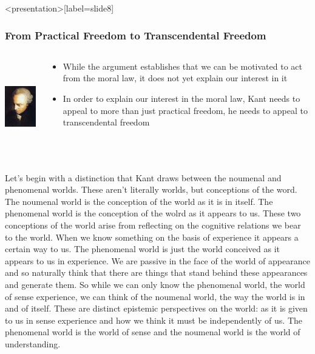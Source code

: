 \begin{frame}<presentation>[label=slide8]
    \frametitle{From Practical Freedom to Transcendental Freedom}
        \begin{columns}
            \begin{column}{3cm}
                \includegraphics[height=4cm]{../../graphics/kant.jpg}
            \end{column}
            \begin{column}{7cm}
                \begin{itemize}
                    \item While the argument establishes that we can be motivated to act from the moral law, it does not yet explain our interest in it
                    \item In order to explain our interest in the moral law, Kant needs to appeal to more than just \alert{practical freedom}, he needs to appeal to \alert{transcendental freedom}
                \end{itemize}
            \end{column}
        \end{columns}
\end{frame}

Let’s begin with a distinction that Kant draws between the noumenal and phenomenal worlds. These aren’t literally worlds, but conceptions of the word. The noumenal world is the conception of the world as it is in itself. The phenomenal world is the conception of the wolrd as it appears to us. These two conceptions of the world arise from reflecting on the cognitive relations we bear to the world. When we know something on the basis of experience it appears a certain way to us. The phenomenal world is just the world conceived as it appears to us in experience. We are passive in the face of the world of appearance and so naturally think that there are things that stand behind these appearances and generate them. So while we can only know the phenomenal world, the world of sense experience, we can think of the noumenal world, the way the world is in and of itself. These are distinct epistemic perspectives on the world: as it is given to us in sense experience and how we think it must be independently of us. The phenomenal world is the world of sense and the noumenal world is the world of understanding.

